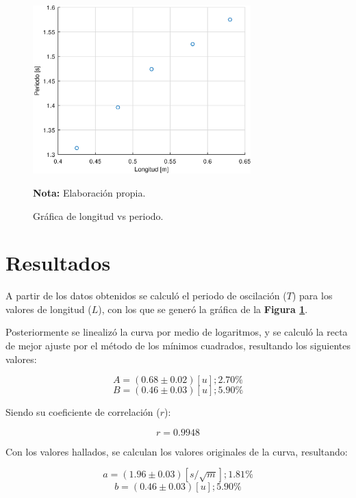 \documentclass[letter,11pt]{article}
\newcommand{\source}[1]{\vspace{-11pt} \caption*{\small{\textbf{Nota:} {#1}}}}
\begin{document}
\begin{figure}
\centering
\includegraphics[width=0.75\textwidth]{resources/o1.1.eps}
\caption{Gráfica de longitud vs periodo.}
\label{figura3}
\source{Elaboración propia.}
\end{figure}

\section{Resultados}

A partir de los datos obtenidos se calculó el periodo de oscilación ($T$) para
los valores de longitud ($L$), con los que se generó la gráfica de la
\textbf{Figura \ref{figura3}}.

Posteriormente se linealizó la curva por medio de logaritmos, y se calculó la
recta de mejor ajuste por el método de los mínimos cuadrados, resultando los
siguientes valores:

\begin{equation*}
    A = (0.68 \pm 0.02) [u]; 2.70\%
\end{equation*}
\begin{equation*}
    B = (0.46 \pm 0.03) [u]; 5.90\%
\end{equation*}
\vspace{0.10cm}

Siendo su coeficiente de correlación ($r$):

\begin{equation*}
    r = 0.9948
\end{equation*}
\vspace{0.10cm}

Con los valores hallados, se calculan los valores originales de la curva,
resultando:

\begin{equation*}
    a = (1.96 \pm 0.03) [s/\sqrt{m}]; 1.81\%
\end{equation*}
\begin{equation*}
    b = (0.46 \pm 0.03) [u]; 5.90\%
\end{equation*}
\vspace{0.10cm}
\end{document}
